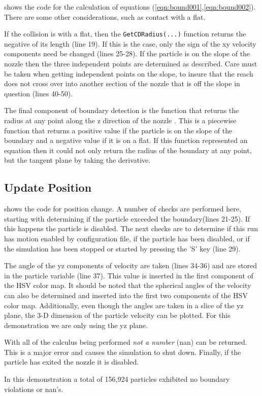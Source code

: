 

 shows the code for the calculation of equations (\ref{eqn:bound001},\ref{eqn:bound002}). There are some other considerations, such as contact with a flat. 

If the collision is with a flat, then the \texttt{GetCDRadius(...)} function returns the negative of its length (line 19). If this is the case, only the sign of the xy velocity components need be changed (lines 25-28). If the particle is on the slope of the nozzle then the three independent points are determined as described. Care must be taken when getting independent points on the slope, to insure that the reach does not cross over into another section of the nozzle that is off the slope in question (lines 40-50).



The final component of boundary detection is the function that returns the radius at any point along the z direction of the nozzle . This is a piecewise function that returns a positive value if the particle is on the slope of the boundary and a negative value if it is on a flat. If this function represented an equation then it could not only return the radius of the boundary at any point, but the tangent plane by taking the derivative.   



\subsection{Update Position}\label{up}

 shows the code for position change. A number of checks are performed here, starting with determining if the particle exceeded the boundary(lines 21-25). If this happens the particle is disabled. The next checks are to determine if this run has motion enabled by configuration file, if the particle has been disabled, or if the simulation has been stopped or started by pressing the 'S' key (line 29).

The angle of the yz components of velocity are taken (lines 34-36) and are stored in the particle variable (line 37). This value is inserted in the first component of the HSV color map. It should be noted that the spherical angles of the velocity can also be determined and inserted into the first two components of the HSV color map. Additionally, even though the angles are taken in a slice of the yz plane, the 3-D dimension of the particle velocity can be plotted. For this demonstration we are only using the yz plane. 

With all of the calculus being performed \textit{not a number} (nan) can be returned. This is a major error and causes the simulation to shut down. Finally, if the particle has exited the nozzle it is disabled. 


In this demonstration a total of 156,924 particles exhibited no boundary violations or nan's.
